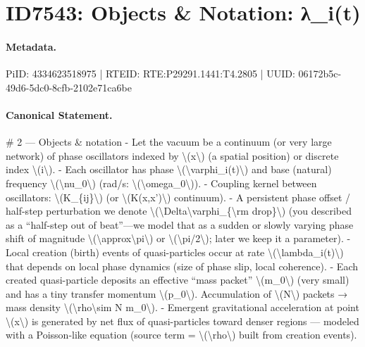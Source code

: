 \section*{ID7543: Objects \& Notation: λ\_i(t)}
\paragraph{Metadata.}
PiID: 4334623518975 | RTEID: RTE:P29291.1441:T4.2805 | UUID: 06172b5c-49d6-5dc0-8cfb-2102e71ca6be

\paragraph{Canonical Statement.}
\# 2 — Objects \& notation - Let the vacuum be a continuum (or very large network) of phase oscillators indexed by \textbackslash{}(x\textbackslash{}) (a spatial position) or discrete index \textbackslash{}(i\textbackslash{}). - Each oscillator has phase \textbackslash{}(\textbackslash{}varphi\_i(t)\textbackslash{}) and base (natural) frequency \textbackslash{}(\textbackslash{}nu\_0\textbackslash{}) (rad/s: \textbackslash{}(\textbackslash{}omega\_0\textbackslash{})). - Coupling kernel between oscillators: \textbackslash{}(K\_\{ij\}\textbackslash{}) (or \textbackslash{}(K(x,x')\textbackslash{}) continuum). - A persistent phase offset / half-step perturbation we denote \textbackslash{}(\textbackslash{}Delta\textbackslash{}varphi\_\{\textbackslash{}rm drop\}\textbackslash{}) (you described as a “half-step out of beat”—we model that as a sudden or slowly varying phase shift of magnitude \textbackslash{}(\textbackslash{}approx\textbackslash{}pi\textbackslash{}) or \textbackslash{}(\textbackslash{}pi/2\textbackslash{}); later we keep it a parameter). - Local creation (birth) events of quasi-particles occur at rate \textbackslash{}(\textbackslash{}lambda\_i(t)\textbackslash{}) that depends on local phase dynamics (size of phase slip, local coherence). - Each created quasi-particle deposits an effective “mass packet” \textbackslash{}(m\_0\textbackslash{}) (very small) and has a tiny transfer momentum \textbackslash{}(p\_0\textbackslash{}). Accumulation of \textbackslash{}(N\textbackslash{}) packets → mass density \textbackslash{}(\textbackslash{}rho\textbackslash{}sim N m\_0\textbackslash{}). - Emergent gravitational acceleration at point \textbackslash{}(x\textbackslash{}) is generated by net flux of quasi-particles toward denser regions — modeled with a Poisson-like equation (source term = \textbackslash{}(\textbackslash{}rho\textbackslash{}) built from creation events).

